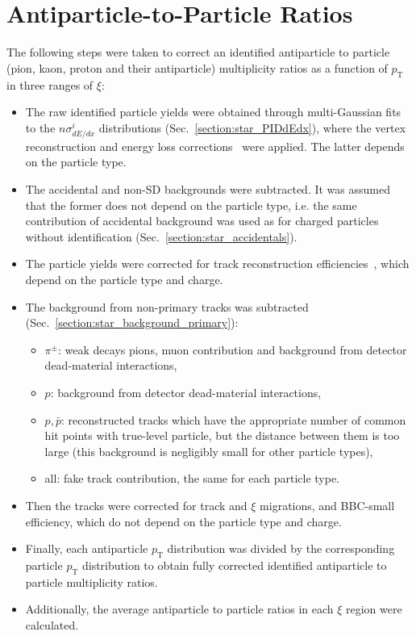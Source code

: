 \section{Antiparticle-to-Particle Ratios}\label{section:star_ratios}
The following steps were taken to correct an  identified antiparticle to particle (pion, kaon, proton and their antiparticle) multiplicity ratios as a function of $p_\textrm{T}$ in three ranges of $\xi$:
\begin{itemize}
	\item The raw identified particle yields were obtained through multi-Gaussian fits to the $n\sigma^i_{dE/dx}$ distributions (Sec.~\ref{section:star_PIDdEdx}), where the vertex reconstruction and energy loss corrections~\cite{supplementaryNote} were applied. The latter depends on the particle type.
	\item The accidental and non-SD backgrounds were subtracted. It was assumed that the former does not depend on the particle type, i.e. the same contribution of accidental background was used as for charged particles without identification (Sec.~\ref{section:star_accidentals}).
	\item The particle yields were corrected for track reconstruction efficiencies~\cite{supplementaryNote}, which depend on the particle type and charge.
	\item The background from non-primary tracks was subtracted (Sec.~\ref{section:star_background_primary}):
	\begin{itemize}
		\item $\pi^\pm$: weak decays pions, muon contribution and background from  detector dead-material interactions,
		\item $p$: background from  detector dead-material interactions,
		\item $p,\bar{p}$: reconstructed tracks which have the appropriate number of common hit points with true-level particle, but the distance between them is too large (this background is negligibly small for other particle types),
		\item all: fake track contribution, the same for each particle type. 
	\end{itemize}
	\item Then the tracks were corrected for track and $\xi$ migrations, and BBC-small efficiency, which do not depend on the particle type and charge.
	\item Finally, each antiparticle $p_\textrm{T}$ distribution was divided by the corresponding particle $p_\textrm{T}$ distribution to obtain fully corrected identified antiparticle to particle multiplicity ratios.
	\item Additionally, the average antiparticle to particle ratios in each $\xi$ region were calculated.
\end{itemize}